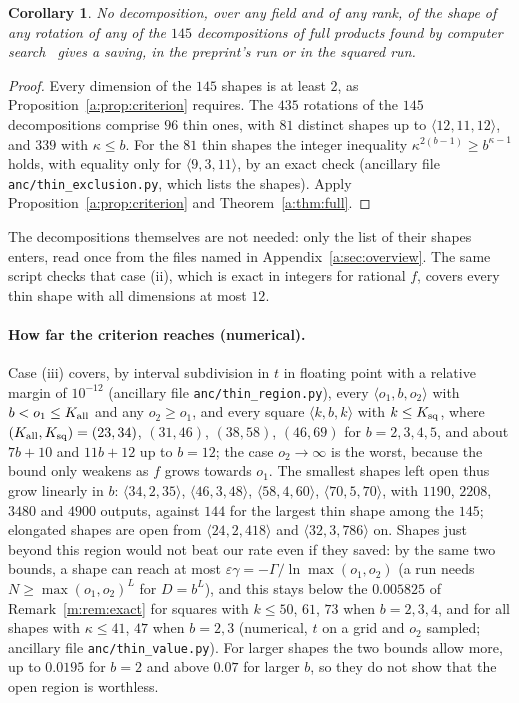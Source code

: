 \documentclass[11pt]{article}
\newtheorem{corollary}[theorem]{Corollary}
\theoremstyle{definition}
\theoremstyle{remark}
\begin{document}
\begin{corollary}\label{a:cor:145}
No decomposition, over any field and of any rank, of the shape of any rotation of any of the $145$ decompositions of full products found by computer search~\cite{FBH+22,KM23,Nov25} gives a saving, in the preprint's run or in the squared run.
\end{corollary}

\begin{proof}
Every dimension of the $145$ shapes is at least $2$, as Proposition~\ref{a:prop:criterion} requires. The $435$ rotations of the $145$ decompositions comprise $96$ thin ones, with $81$ distinct shapes up to $\langle12,11,12\rangle$, and $339$ with $\kappa\le b$. For the $81$ thin shapes the integer inequality $\kappa^{2(b-1)}\ge b^{\kappa-1}$ holds, with equality only for $\langle9,3,11\rangle$, by an exact check (ancillary file \texttt{anc/thin\_exclusion.py}, which lists the shapes). Apply Proposition~\ref{a:prop:criterion} and Theorem~\ref{a:thm:full}.
\end{proof}

The decompositions themselves are not needed: only the list of their shapes enters, read once from the files named in Appendix~\ref{a:sec:overview}. The same script checks that case (ii), which is exact in integers for rational $f$, covers every thin shape with all dimensions at most $12$.

\paragraph{How far the criterion reaches (numerical).} Case (iii) covers, by interval subdivision in $t$ in floating point with a relative margin of $10^{-12}$ (ancillary file \texttt{anc/thin\_region.py}), every $\langle o_1,b,o_2\rangle$ with $b<o_1\le K_{\rm all}$ and any $o_2\ge o_1$, and every square $\langle k,b,k\rangle$ with $k\le K_{\rm sq}$, where $(K_{\rm all},K_{\rm sq})=(23,34)$, $(31,46)$, $(38,58)$, $(46,69)$ for $b=2,3,4,5$, and about $7b+10$ and $11b+12$ up to $b=12$; the case $o_2\to\infty$ is the worst, because the bound only weakens as $f$ grows towards $o_1$. The smallest shapes left open thus grow linearly in $b$: $\langle34,2,35\rangle$, $\langle46,3,48\rangle$, $\langle58,4,60\rangle$, $\langle70,5,70\rangle$, with $1190$, $2208$, $3480$ and $4900$ outputs, against $144$ for the largest thin shape among the $145$; elongated shapes are open from $\langle24,2,418\rangle$ and $\langle32,3,786\rangle$ on. Shapes just beyond this region would not beat our rate even if they saved: by the same two bounds, a shape can reach at most $\varepsilon\gamma=-\Gamma/\ln\max(o_1,o_2)$ (a run needs $N\ge\max(o_1,o_2)^L$ for $D=b^L$), and this stays below the $0.005825$ of Remark~\ref{m:rem:exact} for squares with $k\le50$, $61$, $73$ when $b=2,3,4$, and for all shapes with $\kappa\le41$, $47$ when $b=2,3$ (numerical, $t$ on a grid and $o_2$ sampled; ancillary file \texttt{anc/thin\_value.py}). For larger shapes the two bounds allow more, up to $0.0195$ for $b=2$ and above $0.07$ for larger $b$, so they do not show that the open region is worthless.
\end{document}
